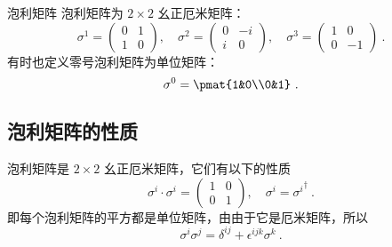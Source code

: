 \begin{definition}{泡利矩阵}
泡利矩阵为 $2\times 2$ 幺正厄米矩阵：
\begin{equation}
\sigma^1 = \begin{pmatrix}
0 & 1\\
1 & 0
\end{pmatrix},\quad 
\sigma^2 = \begin{pmatrix}
0 & -i\\
i & 0
\end{pmatrix},\quad 
\sigma^3 = 
\begin{pmatrix}
1 & 0\\
0 & -1
\end{pmatrix}
~.
\end{equation}
有时也定义零号泡利矩阵为单位矩阵：
\begin{equation}
\sigma^0 = \pmat{1&0\\0&1}~.
\end{equation}

\end{definition}

\subsection{泡利矩阵的性质}
泡利矩阵是 $2\times 2$ 幺正厄米矩阵，它们有以下的性质
\begin{equation}
\sigma^i\cdot \sigma^i = \begin{pmatrix}1&0\\0&1\end{pmatrix},\quad \sigma^i = {\sigma^i}^\dagger~.
\end{equation}
即每个泡利矩阵的平方都是单位矩阵，由由于它是厄米矩阵，所以
\begin{equation}
\sigma^i\sigma^j = \delta^{ij} + \epsilon^{ijk}\sigma^k~.
\end{equation}
